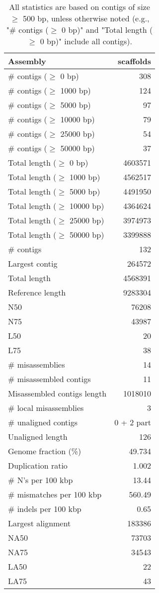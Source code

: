 \documentclass[12pt,a4paper]{article}
\begin{document}
\begin{table}[ht]
\begin{center}
\caption{All statistics are based on contigs of size $\geq$ 500 bp, unless otherwise noted (e.g., "\# contigs ($\geq$ 0 bp)" and "Total length ($\geq$ 0 bp)" include all contigs).}
\begin{tabular}{|l*{1}{|r}|}
\hline
Assembly & scaffolds \\ \hline
\# contigs ($\geq$ 0 bp) & 308 \\ \hline
\# contigs ($\geq$ 1000 bp) & 124 \\ \hline
\# contigs ($\geq$ 5000 bp) & 97 \\ \hline
\# contigs ($\geq$ 10000 bp) & 79 \\ \hline
\# contigs ($\geq$ 25000 bp) & 54 \\ \hline
\# contigs ($\geq$ 50000 bp) & 37 \\ \hline
Total length ($\geq$ 0 bp) & 4603571 \\ \hline
Total length ($\geq$ 1000 bp) & 4562517 \\ \hline
Total length ($\geq$ 5000 bp) & 4491950 \\ \hline
Total length ($\geq$ 10000 bp) & 4364624 \\ \hline
Total length ($\geq$ 25000 bp) & 3974973 \\ \hline
Total length ($\geq$ 50000 bp) & 3399888 \\ \hline
\# contigs & 132 \\ \hline
Largest contig & 264572 \\ \hline
Total length & 4568391 \\ \hline
Reference length & 9283304 \\ \hline
N50 & 76208 \\ \hline
N75 & 43987 \\ \hline
L50 & 20 \\ \hline
L75 & 38 \\ \hline
\# misassemblies & 14 \\ \hline
\# misassembled contigs & 11 \\ \hline
Misassembled contigs length & 1018010 \\ \hline
\# local misassemblies & 3 \\ \hline
\# unaligned contigs & 0 + 2 part \\ \hline
Unaligned length & 126 \\ \hline
Genome fraction (\%) & 49.734 \\ \hline
Duplication ratio & 1.002 \\ \hline
\# N's per 100 kbp & 13.44 \\ \hline
\# mismatches per 100 kbp & 560.49 \\ \hline
\# indels per 100 kbp & 0.65 \\ \hline
Largest alignment & 183386 \\ \hline
NA50 & 73703 \\ \hline
NA75 & 34543 \\ \hline
LA50 & 22 \\ \hline
LA75 & 43 \\ \hline
\end{tabular}
\end{center}
\end{table}
\end{document}
